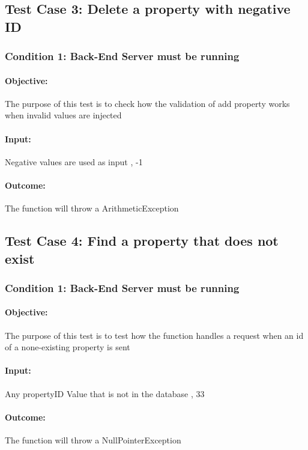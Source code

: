 \documentclass[a4paper,12pt]{article}
\begin{document}
\subsection{Test Case 3: Delete a property with negative ID}
\subsubsection{Condition 1: Back-End Server must be running}
\paragraph{Objective:}The purpose of this test is to check how the validation of add property works when invalid values are injected 
\paragraph{Input:} Negative values are used as input , -1
\paragraph{Outcome: } The function will throw a ArithmeticException

\subsection{Test Case 4: Find a property that does not exist}
\subsubsection{Condition 1: Back-End Server must be running}
\paragraph{Objective:}The purpose of this test is to test how the function handles a request when an id of a none-existing property is sent
\paragraph{Input:} Any propertyID Value that is not in the database , 33
\paragraph{Outcome: } The function will throw a NullPointerException
\end{document}
